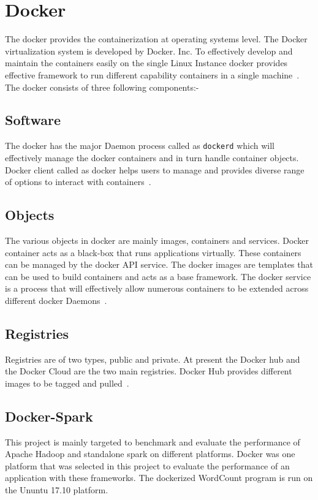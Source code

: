 \section{Docker}

The docker provides the containerization at operating systems level. 
The Docker virtualization system is developed by Docker. Inc. 
To effectively develop and maintain the containers easily
 on the single Linux Instance docker provides effective
 framework to run different capability
 containers in a single machine~\cite{hid-sp18-412-docker_wikepedia}. 
The docker consists of three following components:-

\subsection{Software}
The docker has the major Daemon process called as \verb|dockerd| 
which will effectively manage the docker containers and in turn 
handle container objects. Docker client called as docker
 helps users to manage and provides diverse range of options
 to interact with containers~\cite{hid-sp18-412-docker_wikepedia}. 

\subsection{Objects}
The various objects in docker are mainly images,
 containers and services. 
Docker container acts as a black-box that runs 
applications virtually. These containers can be managed by 
the docker API service. The docker images are templates 
that can be used to build containers and acts as a base
 framework. The docker service is a process
 that will effectively allow numerous containers to be
 extended across
different docker Daemons~\cite{hid-sp18-412-docker_wikepedia}. 

\subsection{Registries}
Registries are of two types, public and private. 
At present the Docker hub and the Docker Cloud are 
the two main registries. Docker 
Hub provides different images to be tagged  
and pulled~\cite{hid-sp18-412-docker_wikepedia}.

\subsection{Docker-Spark}
This project is mainly targeted to benchmark and evaluate 
the performance of Apache Hadoop and standalone 
spark on different platforms. Docker was one
platform that was selected in this project to 
evaluate the performance of an application with these frameworks.
The dockerized WordCount program is run on the Ununtu 17.10 platform. 

